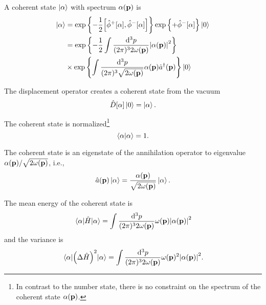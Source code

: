 \begin{definition}
	A coherent state $\ket{\alpha}$ with spectrum $\alpha(\vb{p})$ is
	\begin{equation}
		\begin{split}
			\ket{\alpha}
			&=
			\exp\left\{
				-
				\frac{1}{2}
				\comm{\hat\phi^+[\alpha]}{\hat\phi^-[\alpha]}
			\right\}
			\exp\left\{
				+\hat\phi^-[\alpha]
			\right\}
			\ket{0}
			\\
			&=
			\exp\left\{
				-
				\frac{1}{2}
				\int\frac{\dd[3]{p}}{(2\pi)^32\omega(\vb{p})}
				\abs{\alpha(\vb{p})}^2
			\right\}
			\\
			&\times
			\exp\left\{
				\int\frac{\dd[3]{p}}{(2\pi)^3\sqrt{2\omega(\vb{p})}}
				\alpha(\vb{p})
				\hat{a}^\dagger(\vb{p})
			\right\}
			\ket{0}
		\end{split}
	\end{equation}
\end{definition}
\begin{lemma}
	The displacement operator creates a coherent state from the vacuum
	\begin{equation}
		\hat{D}[\alpha]
		\ket{0}
		=
		\ket{\alpha}
		.
	\end{equation}
\end{lemma}
\begin{corollary}
	The coherent state is normalized\footnote{In contrast to the number state, there is no constraint on the spectrum of the coherent state $\alpha(\vb{p})$.}
	\begin{equation}
		\braket{\alpha}
		=
		1
		.
	\end{equation}
\end{corollary}
\begin{theorem}\label{thm:coherent_state_annihilation_eigenvalue}
	The coherent state is an eigenstate of the annihilation operator to eigenvalue $\alpha(\vb{p})/\sqrt{2\omega(\vb{p})}$, i.e.,
	\begin{equation}
		\hat{a}(\vb{p})
		\ket{\alpha}
		=
		\frac{\alpha(\vb{p})}{\sqrt{2\omega(\vb{p})}}
		\ket{\alpha}
		.
	\end{equation}
\end{theorem}
\begin{lemma}\label{thm:coherent_state_energy_observable}
	The mean energy of the coherent state is
	\begin{equation}
		\expval{\hat{H}}{\alpha}
		=
		\int\frac{\dd[3]{p}}{(2\pi)^32\omega(\vb{p})}
		\omega(\vb{p})
		\abs{\alpha(\vb{p})}^2
	\end{equation}
	and the variance is
	\begin{equation}
		\expval{\left(\Delta\hat{H}\right)^2}{\alpha}
		=
		\int\frac{\dd[3]{p}}{(2\pi)^32\omega(\vb{p})}
		\omega(\vb{p})^2
		\abs{\alpha(\vb{p})}^2
		.
	\end{equation}
\end{lemma}
